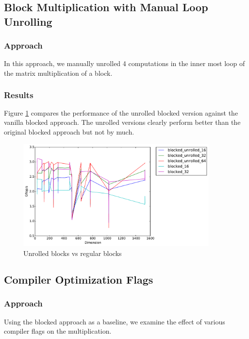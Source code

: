 \documentclass[11pt]{article}
\theoremstyle{plain}
\theoremstyle{definition}
\begin{document}
\subsection{Block Multiplication with Manual Loop Unrolling}
\subsubsection{Approach}
In this approach, we manually unrolled 4 computations in the inner most loop of the matrix multiplication of a block. 
\subsubsection{Results}
Figure \ref{unrolled_vs_regular} compares the performance of the unrolled blocked version against the vanilla blocked approach. The unrolled versions clearly perform better than the original blocked approach but not by much. 
\begin{figure}[H]
    \includegraphics[width=0.9\textwidth]{timing_unrolled_vs_nonunrolled.pdf}
    \caption{Unrolled blocks vs regular blocks}
    \label{unrolled_vs_regular}
\end{figure} 

\subsection{Compiler Optimization Flags}
\subsubsection{Approach}
Using the blocked approach as a baseline, we examine the effect of various compiler flags on the multiplication.
\end{document}
